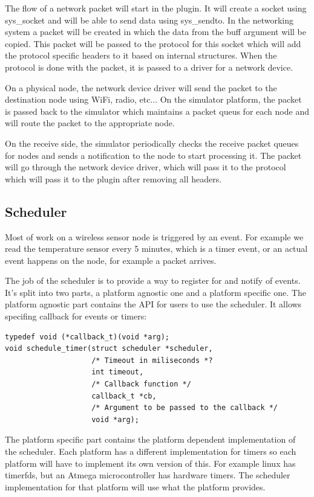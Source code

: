 The flow of a network packet will start in the plugin. It will create a socket
using sys\_socket and will be able to send data using sys_sendto. In the
networking system a packet will be created in which the data from the buff
argument will be copied. This packet will be passed to the protocol for this
socket which will add the protocol specific headers to it based on internal
structures. When the protocol is done with the packet, it is passed to a
driver for a network device.

On a physical node, the network device driver will send the packet to the
destination node using WiFi, radio, etc... On the simulator platform, the
packet is passed back to the simulator which maintains a packet queus for each
node and will route the packet to the appropriate node.

On the receive side, the simulator periodically checks the receive packet
queues for nodes and sends a notification to the node to start processing it.
The packet will go through the network device driver, which will pass it to
the protocol which will pass it to the plugin after removing all headers.

\subsection{Scheduler}

Most of work on a wireless sensor node is triggered by an event. For example
we read the temperature sensor every 5 minutes, which is a timer event, or an
actual event happens on the node, for example a packet arrives.

The job of the scheduler is to provide a way to register for and notify of
events. It's split into two parts, a platform agnostic one and a platform
specific one. The platform agnostic part contains the API for users to use the
scheduler. It allows specifing callback for events or timers:

\begin{lstlisting}
typedef void (*callback_t)(void *arg);
void schedule_timer(struct scheduler *scheduler,
                    /* Timeout in miliseconds *?
                    int timeout, 
                    /* Callback function */
                    callback_t *cb, 
                    /* Argument to be passed to the callback */
                    void *arg);
\end{lstlisting}
The platform specific part contains the platform dependent implementation of
the scheduler. Each platform has a different implementation for timers so each
platform will have to implement its own version of this. For example linux has
timerfds, but an Atmega microcontroller has hardware timers. The scheduler
implementation for that platform will use what the platform provides.

